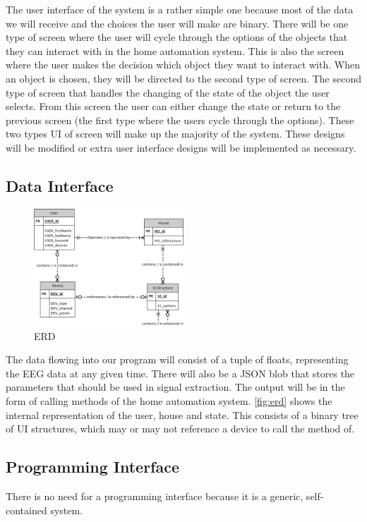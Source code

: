 \documentclass{article}
\begin{document}
The user interface of the system is a rather simple one because most of the data we will receive and the choices the user will make are binary. There will be one type of screen where the user will cycle through the options of the objects that they can interact with in the home automation system. This is also the screen where the user makes the decision which object they want to interact with. When an object is chosen, they will be directed to the second type of screen. The second type of screen that handles the changing of the state of the object the user selects. From this screen the user can either change the state or return to the previous screen (the first type where the users cycle through the options). These two types UI of screen will make up the majority of the system. These designs will be modified or extra user interface designs will be implemented as necessary. 

\subsection{Data Interface}
\begin{figure}[h!]

  \centering
    \includegraphics[width=0.5\textwidth]{ERD}
   \caption{ERD}
   	\label{fig:erd}
\end{figure}

The data flowing into our program will consist of a tuple of floats,
representing the EEG data at any given time. There will also be a JSON blob
that stores the parameters that should be used in signal extraction. The
output will be in the form of calling methods of the home automation system.
\autoref{fig:erd} shows the internal representation of the user, house and
state. This consists of a binary tree of UI structures, which may or may not
reference a device to call the method of.

\subsection{Programming Interface} 
There is no need for a programming interface because it is a generic, self-contained system.
\end{document}
